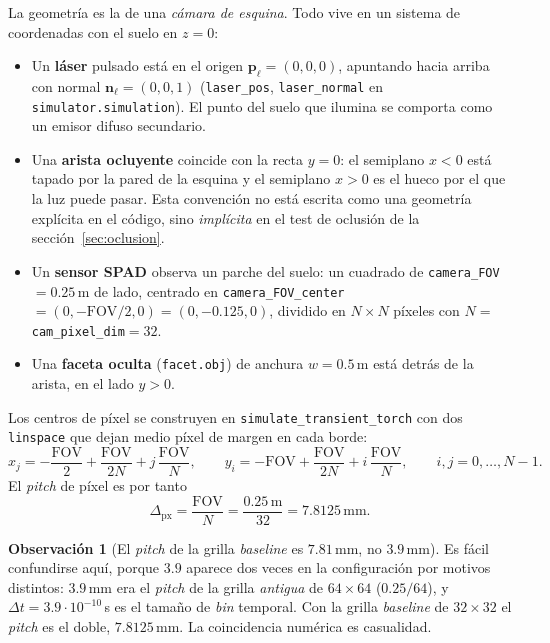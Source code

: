 \documentclass[11pt,a4paper]{article}
\newcommand{\vect}[1]{\boldsymbol{#1}}
\newcommand{\code}[1]{\texttt{#1}}
\theoremstyle{definition}
\newtheorem{obs}{Observación}
\theoremstyle{plain}
\begin{document}
La geometría es la de una \emph{cámara de esquina}. Todo vive en un sistema de
coordenadas con el suelo en $z=0$:

\begin{itemize}[leftmargin=*]
  \item Un \textbf{láser} pulsado está en el origen $\vect p_\ell=(0,0,0)$,
        apuntando hacia arriba con normal $\vect n_\ell=(0,0,1)$
        (\code{laser\_pos}, \code{laser\_normal} en
        \code{simulator.simulation}). El punto del suelo que ilumina se comporta
        como un emisor difuso secundario.
  \item Una \textbf{arista ocluyente} coincide con la recta $y=0$: el
        semiplano $x<0$ está tapado por la pared de la esquina y el semiplano
        $x>0$ es el hueco por el que la luz puede pasar. Esta convención no está
        escrita como una geometría explícita en el código, sino \emph{implícita}
        en el test de oclusión de la sección~\ref{sec:oclusion}.
  \item Un \textbf{sensor SPAD} observa un parche del suelo: un cuadrado de
        \code{camera\_FOV}$=0.25\,$m de lado, centrado en
        \code{camera\_FOV\_center}$=(0,-\text{FOV}/2,0)=(0,-0.125,0)$, dividido
        en $N\times N$ píxeles con $N=$\code{cam\_pixel\_dim}$=32$.
  \item Una \textbf{faceta oculta} (\code{facet.obj}) de anchura
        $w=0.5\,$m está detrás de la arista, en el lado $y>0$.
\end{itemize}

Los centros de píxel se construyen en \code{simulate\_transient\_torch} con dos
\code{linspace} que dejan medio píxel de margen en cada borde:
%
\begin{equation}
\label{eq:grid}
x_j = -\frac{\text{FOV}}{2}+\frac{\text{FOV}}{2N}+j\,\frac{\text{FOV}}{N},
\qquad
y_i = -\text{FOV}+\frac{\text{FOV}}{2N}+i\,\frac{\text{FOV}}{N},
\qquad i,j=0,\dots,N-1 .
\end{equation}
%
El \emph{pitch} de píxel es por tanto
%
\begin{equation}
\label{eq:pitch}
\Delta_{\text{px}} = \frac{\text{FOV}}{N} = \frac{0.25\,\text{m}}{32}
= 7.8125\,\text{mm}.
\end{equation}

\begin{obs}[El \emph{pitch} de la grilla \emph{baseline} es $7.81\,$mm, no
$3.9\,$mm]
\label{obs:pitch}
Es fácil confundirse aquí, porque $3.9$ aparece dos veces en la configuración
por motivos distintos: $3.9\,$mm era el \emph{pitch} de la grilla \emph{antigua}
de $64\times64$ ($0.25/64$), y $\Delta t = 3.9\cdot10^{-10}\,$s es el tamaño de
\emph{bin} temporal. Con la grilla \emph{baseline} de $32\times32$ el
\emph{pitch} es el doble, $7.8125\,$mm. La coincidencia numérica es casualidad.
\end{obs}
\end{document}
